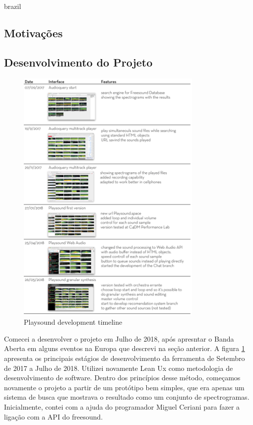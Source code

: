\begin{otherlanguage*}{brazil}
\subsection{Motivações}




\subsection{Desenvolvimento do Projeto}


\begin{figure}
\centering
\includegraphics[width=0.8\textwidth]{pictures/playsoundtimeline}
\caption{\label{pstimeline}Playsound development timeline}
\label{fig:timeline}
\end{figure}

Comecei a desenvolver o projeto em Julho de 2018, após apresntar o Banda Aberta em alguns eventos na Europa que descrevi na seção anterior. A figura \ref{fig:timeline} apresenta os principais estágios de desenvolvimento da ferramenta de Setembro de 2017 a Julho de 2018. Utilizei novamente Lean Ux \cite{Liikkanen2014} como metodologia de desenvolvimento de software. Dentro dos princípios desse método, começamos novamente o projeto a partir de um protótipo bem simples, que era apenas um sistema de busca que mostrava o resultado como um conjunto de spectrogramas. Inicialmente, contei com a ajuda do programador Miguel Ceriani para fazer a ligação com a API do freesound.


\end{otherlanguage*}
